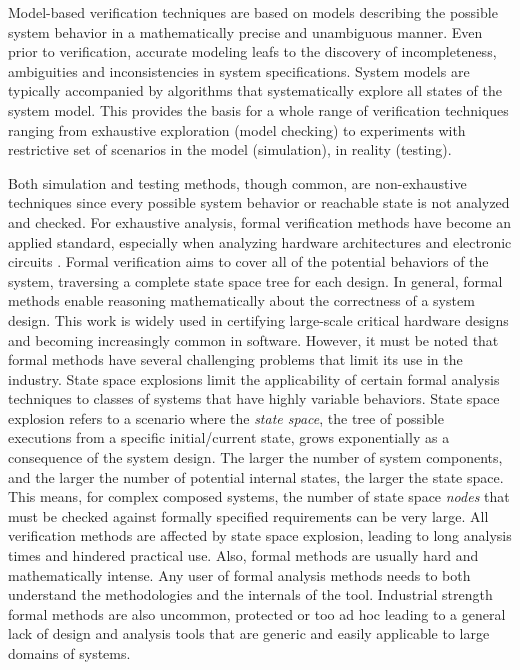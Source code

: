 Model-based verification techniques are based on models describing the possible system behavior in a mathematically precise and unambiguous manner. Even prior to verification, accurate modeling leafs to the discovery of incompleteness, ambiguities and inconsistencies in system specifications. System models are typically accompanied by algorithms that systematically explore all states of the system model. This provides the basis for a whole range of verification techniques ranging from exhaustive exploration (model checking) to experiments with restrictive set of scenarios in the model (simulation), in reality (testing). 

Both simulation and testing methods, though common, are non-exhaustive techniques since every possible system behavior or reachable state is not analyzed and checked. For exhaustive analysis, formal verification methods have become an applied standard, especially when analyzing hardware architectures  and electronic circuits \cite{chen1996verification, appenzeller1995formal}. Formal verification aims to cover all of the potential behaviors of the system, traversing a complete state space tree for each design. In general, formal methods enable reasoning mathematically about the correctness of a system design. This work is widely used in certifying large-scale critical hardware designs and becoming increasingly common in software. However, it must be noted that formal methods have several challenging problems that limit its use in the industry. State space explosions limit the applicability of certain formal analysis techniques to classes of systems that have highly variable behaviors. State space explosion refers to a scenario where the \emph{state space}, the tree of possible executions from a specific initial/current state, grows exponentially as a consequence of the system design. The larger the number of system components, and the larger the number of potential internal states, the larger the state space. This means, for complex composed systems, the number of state space \emph{nodes} that must be checked against formally specified requirements can be very large. All verification methods are affected by state space explosion, leading to long analysis times and hindered practical use. Also, formal methods are usually hard and mathematically intense. Any user of formal analysis methods needs to both understand the methodologies and the internals of the tool. Industrial strength formal methods are also uncommon, protected or too ad hoc leading to a general lack of design and analysis tools  that are generic and easily applicable to large domains of systems. 

